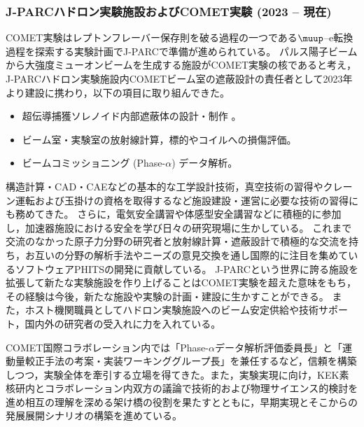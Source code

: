 \documentclass[11pt,a4paper,uplatex,dvipdfmx]{ujarticle} 		%
\newcommand{\研究課題名}{象の卵}
\newcommand{\研究機関名}{東京大学}
\newcommand{\研究代表者氏名}{内山雄祐}
\newcommand{\研究期間の最終元号年度}{6}  %
\begin{document}
\vspace{-1zw}
\subsubsection{J-PARCハドロン実験施設およびCOMET実験 (2023 -- 現在)}
COMET実験はレプトンフレーバー保存則を破る過程の一つである$\muup$--e転換過程を探索する実験計画でJ-PARCで準備が進められている。
パルス陽子ビームから大強度ミューオンビームを生成する施設がCOMET実験の核であると考え，J-PARCハドロン実験施設内COMETビーム室の遮蔽設計の責任者として2023年より建設に携わり，以下の項目に取り組んできた。
\begin{itemize}%
\setlength{\itemsep}{0cm}
	 \item 超伝導捕獲ソレノイド内部遮蔽体の設計・制作 \cite{YU:shield,jps2025s,jparc2024}。
    \item ビーム室・実験室の放射線計算，標的やコイルへの損傷評価\cite{phits2025-2,phits2025-1}。
    \item ビームコミッショニング (Phase-$\alpha$) データ解析\cite{YU:commissioning}。
\end{itemize}
構造計算・CAD・CAEなどの基本的な工学設計技術，真空技術の習得やクレーン運転および玉掛けの資格を取得するなど施設建設・運営に必要な技術の習得にも務めてきた。
さらに，電気安全講習や体感型安全講習などに積極的に参加し，加速器施設における安全を学び日々の研究現場に生かしている。
これまで交流のなかった原子力分野の研究者と放射線計算・遮蔽設計で積極的な交流を持ち，お互いの分野の解析手法やニーズの意見交換を通し国際的に注目を集めているソフトウェアPHITSの開発に貢献している。
J-PARCという世界に誇る施設を拡張して新たな実験施設を作り上げることはCOMET実験を超えた意味をもち，その経験は今後，新たな施設や実験の計画・建設に生かすことができる。%
また，ホスト機関職員としてハドロン実験施設へのビーム安定供給や技術サポート，国内外の研究者の受入れに力を入れている。


COMET国際コラボレーション内では「Phase-$\alpha$データ解析評価委員長」と「運動量較正手法の考案・実装ワーキンググループ長」を兼任するなど，信頼を構築しつつ，実験全体を牽引する立場を得てきた。また，実験実現に向け，KEK素核研内とコラボレーション内双方の議論で技術的および物理サイエンス的検討を進め相互の理解を深める架け橋の役割を果たすとともに，早期実現とそこからの発展展開シナリオの構築を進めている。
\end{document}
